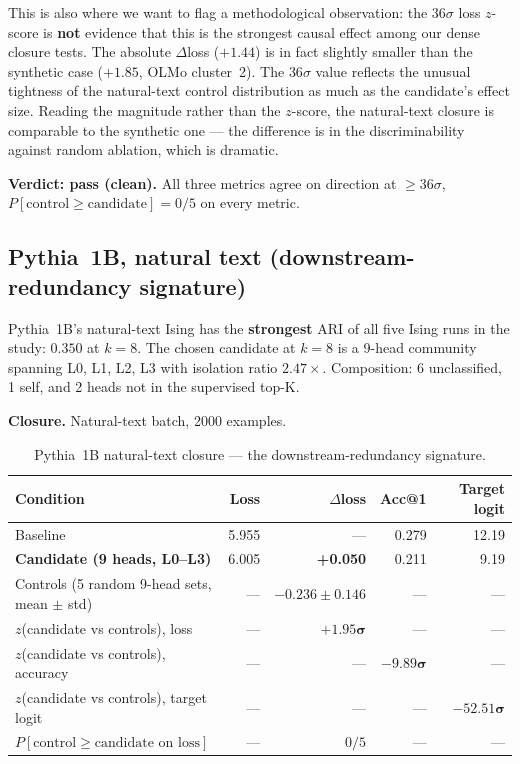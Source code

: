 \documentclass[11pt]{article}
\begin{document}
This is also where we want to flag a methodological observation: the
$36\sigma$ loss $z$-score is \textbf{not} evidence that this is the
strongest causal effect among our dense closure tests. The absolute
$\Delta$loss ($+1.44$) is in fact slightly smaller than the synthetic case
($+1.85$, OLMo cluster~2). The $36\sigma$ value reflects the unusual
tightness of the natural-text control distribution as much as the
candidate's effect size. Reading the magnitude rather than the $z$-score,
the natural-text closure is comparable to the synthetic one --- the
difference is in the discriminability against random ablation, which is
dramatic.

\textbf{Verdict: pass (clean).} All three metrics agree on direction at
$\geq 36\sigma$, $P[\text{control} \geq \text{candidate}] = 0/5$ on every
metric.

\subsection{Pythia~1B, natural text (downstream-redundancy signature)}
\label{sec:pythia-natural}

Pythia~1B's natural-text Ising has the \textbf{strongest} ARI of all five
Ising runs in the study: $0.350$ at $k=8$. The chosen candidate at $k=8$
is a 9-head community spanning L0, L1, L2, L3 with isolation ratio
$2.47\times$. Composition: 6 unclassified, 1 self, and 2 heads not in the
supervised top-K.

\textbf{Closure.} Natural-text batch, 2000 examples.

\begin{table}[h]
\centering
\small
\begin{tabularx}{\textwidth}{lrrrr}
\toprule
Condition & Loss & $\Delta$loss & Acc@1 & Target logit \\
\midrule
Baseline & 5.955 & --- & 0.279 & 12.19 \\
\textbf{Candidate (9 heads, L0--L3)} & 6.005 & \textbf{+0.050} & 0.211 & 9.19 \\
Controls (5 random 9-head sets, mean $\pm$ std) & --- & $-0.236 \pm 0.146$ & --- & --- \\
$z$(candidate vs controls), loss & --- & $\mathbf{+1.95\sigma}$ & --- & --- \\
$z$(candidate vs controls), accuracy & --- & --- & $\mathbf{-9.89\sigma}$ & --- \\
$z$(candidate vs controls), target logit & --- & --- & --- & $\mathbf{-52.51\sigma}$ \\
$P[\text{control} \geq \text{candidate on loss}]$ & --- & $0/5$ & --- & --- \\
\bottomrule
\end{tabularx}
\caption{Pythia~1B natural-text closure --- the downstream-redundancy
signature.}
\label{tab:pythia-natural}
\end{table}
\end{document}
